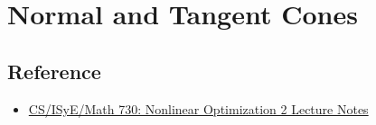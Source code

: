 \chapter{Normal and Tangent Cones}


\section{Reference}
\begin{itemize}
    \item \href{}{CS/ISyE/Math 730: Nonlinear Optimization 2 Lecture Notes}
\end{itemize}
